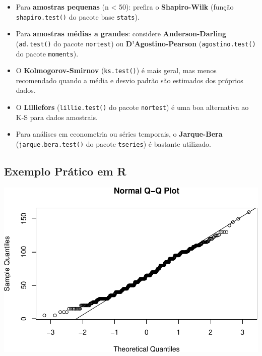 \documentclass[
]{book}
\newenvironment{Shaded}{\begin{snugshade}}{\end{snugshade}}
\newcommand{\CommentTok}[1]{\textcolor[rgb]{0.56,0.35,0.01}{\textit{#1}}}
\newcommand{\FunctionTok}[1]{\textcolor[rgb]{0.13,0.29,0.53}{\textbf{#1}}}
\newcommand{\NormalTok}[1]{#1}
\newcommand{\OtherTok}[1]{\textcolor[rgb]{0.56,0.35,0.01}{#1}}
\newcommand{\SpecialCharTok}[1]{\textcolor[rgb]{0.81,0.36,0.00}{\textbf{#1}}}
\newcommand{\StringTok}[1]{\textcolor[rgb]{0.31,0.60,0.02}{#1}}
\providecommand{\tightlist}{%
  \setlength{\itemsep}{0pt}\setlength{\parskip}{0pt}}
\begin{document}
\begin{itemize}
\tightlist
\item
  Para \textbf{amostras pequenas} (n \textless{} 50): prefira o \textbf{Shapiro-Wilk} (função \texttt{shapiro.test()} do pacote base \texttt{stats}).
\item
  Para \textbf{amostras médias a grandes}: considere \textbf{Anderson-Darling} (\texttt{ad.test()} do pacote \texttt{nortest}) ou \textbf{D'Agostino-Pearson} (\texttt{agostino.test()} do pacote \texttt{moments}).
\item
  O \textbf{Kolmogorov-Smirnov} (\texttt{ks.test()}) é mais geral, mas menos recomendado quando a média e desvio padrão são estimados dos próprios dados.
\item
  O \textbf{Lilliefors} (\texttt{lillie.test()} do pacote \texttt{nortest}) é uma boa alternativa ao K-S para dados amostrais.
\item
  Para análises em econometria ou séries temporais, o \textbf{Jarque-Bera} (\texttt{jarque.bera.test()} do pacote \texttt{tseries}) é bastante utilizado.
\end{itemize}

\subsection{Exemplo Prático em R}\label{exemplo-pruxe1tico-em-r-1}

\begin{Shaded}
\end{Shaded}

\includegraphics{LivroEstatisticaR_files/figure-latex/testenormex-1.pdf}
\end{document}
